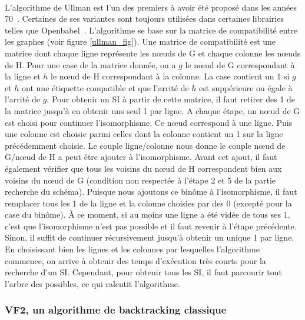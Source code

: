 \documentclass[12pt,french,twoside]{report}
\begin{document}
\paragraph{}L'algorithme de Ullman est l'un des premiers à avoir été proposé dans les années 70~\cite{ullmann_algorithm_1976}.
Certaines de ses variantes sont toujours utilisées dans certaines librairies telles que Openbabel~\cite{oboyle_open_2011}.
L'algorithme se base sur la matrice de compatibilité entre les graphes (voir figure \ref{ullman_fig}).
Une matrice de compatibilité est une matrice dont chaque ligne représente les n\oe{}uds de G et chaque colonne les n\oe{}uds de H.
Pour une case de la matrice donnée, on a $g$ le n\oe{}ud de G correspondant à la ligne et $h$ le n\oe{}ud de H correspondant à la colonne.
La case contient un 1 si $g$ et $h$ ont une étiquette compatible et que l'arrité de $h$ est suppérieure ou égale à l'arrité de $g$.
Pour obtenir un SI à partir de cette matrice, il faut retirer des 1 de la matrice jusqu'à en obtenir uns seul 1 par ligne.
A chaque étape, un n\oe{}ud de G est choisi pour continuer l'isomorphisme.
Ce n\oe{}ud correspond à une ligne.
Puis une colonne est choisie parmi celles dont la colonne contient un 1 sur la ligne précédemment choisie.
Le couple ligne/colonne nous donne le couple n\oe{}ud de G/n\oe{}ud de H a peut être ajouter à l'isomorphisme.
Avant cet ajout, il faut également vérifier que tous les voisins du n\oe{}ud de H correspondent bien aux voisins du n\oe{}ud de G (condition non respectée à l'étape 2 et 5 de la partie recherche du schéma).
Puisque nous ajoutons ce binôme à l'isomorphisme, il faut remplacer tous les 1 de la ligne et la colonne choisies par des 0 (excepté pour la case du binôme).
À ce moment, si au moins une ligne a été vidée de tous ses 1, c'est que l'isomorphisme n'est pas possible et il faut revenir à l'étape précédente.
Sinon, il suffit de continuer récursivement jusqu'à obtenir un unique 1 par ligne.
En choisissant bien les lignes et les colonnes par lesquelles l'algorithme commence, on arrive à obtenir des temps d'exécution très courts pour la recherche d'un SI.
Cependant, pour obtenir tous les SI, il faut parcourir tout l'arbre des possibles, ce qui ralentit l'algorithme.


\subsubsection{VF2, un algorithme de backtracking classique}
\end{document}

